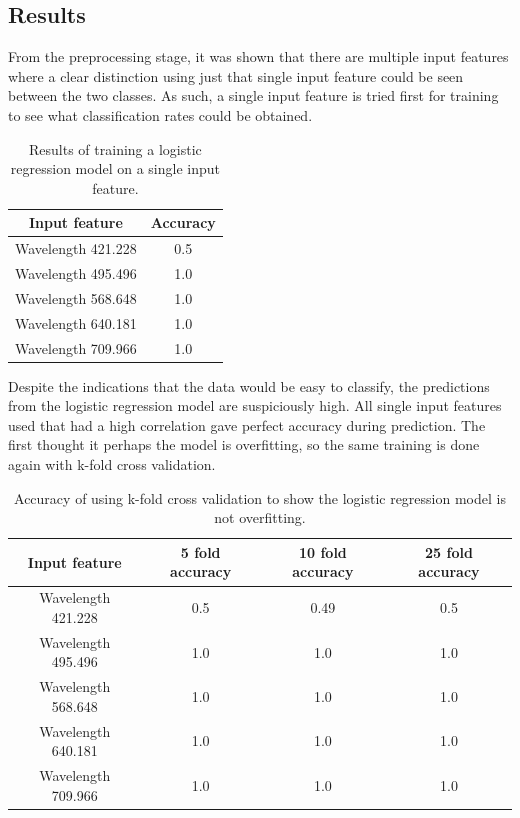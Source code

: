 \documentclass{article}
\begin{document}
\subsection{Results}
From the preprocessing stage, it was shown that there are multiple input features where a clear distinction using just that single input feature could be seen between the two classes. As such, a single input feature is tried first for training to see what classification rates could be obtained. 
\begin{table}[H]
\centering
\begin{tabular}{| c | c |}
\hline
\textbf{Input feature} & \textbf{Accuracy} \\
\hline
Wavelength 421.228 & 0.5 \\
\hline
Wavelength 495.496 & 1.0 \\
\hline
Wavelength 568.648 & 1.0 \\
\hline
Wavelength 640.181 & 1.0 \\
\hline
Wavelength 709.966 & 1.0 \\
\hline
\end{tabular}
\caption{Results of training a logistic regression model on a single input feature.}
\end{table}
\noindent
Despite the indications that the data would be easy to classify, the predictions from the logistic regression model are suspiciously high. All single input features used that had a high correlation gave perfect accuracy during prediction. The first thought it perhaps the model is overfitting, so the same training is done again with k-fold cross validation. 
\begin{table}[H]
\centering
\begin{tabular}{| c | c | c | c |}
\hline
\textbf{Input feature} & \textbf{5 fold accuracy} & \textbf{10 fold accuracy} & \textbf{25 fold accuracy} \\
\hline
Wavelength 421.228 & 0.5 & 0.49 & 0.5 \\
\hline
Wavelength 495.496 & 1.0 & 1.0 & 1.0 \\
\hline
Wavelength 568.648 & 1.0 & 1.0 & 1.0 \\
\hline
Wavelength 640.181 & 1.0 & 1.0 & 1.0 \\
\hline
Wavelength 709.966 & 1.0 & 1.0 & 1.0 \\
\hline
\end{tabular}
\caption{Accuracy of using k-fold cross validation to show the logistic regression model is not overfitting.}
\end{table}
\end{document}
